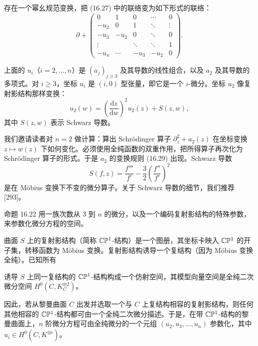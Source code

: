\begin{proposition}[16.22（{{[107, Thm. 1]}}）] 存在一个幂幺规范变换，把 (16.27) 中的联络变为如下形式的联络：
\begin{equation}
\partial+
\begin{pmatrix}
0&1&0&\cdots&0\\
-u_2&0&1&\ddots&\vdots\\
-u_3&-u_2&0&\ddots&0\\
\vdots&&\ddots&\ddots&1\\
-u_n&\cdots&-u_3&-u_2&0
\end{pmatrix}.
\tag{16.28}
\end{equation}
\end{proposition}

上面的 $u_i$（$i=2,\dots,n$）是 $(a_j)_{j\ge3}$ 及其导数的线性组合，以及 $a_2$ 及其导数的多项式。对 $i\ge3$，坐标 $u_i$ 是 $(i,0)$ 型张量，即它是一个 $i$-微分。坐标 $u_2$ 像复射影结构那样变换：
\begin{equation}
u_2(w)=\left(\frac{\mathrm{d}z}{\mathrm{d}w}\right)^2u_2(z)+S(z,w),
\tag{16.29}
\end{equation}
其中 $S(z,w)$ 表示 Schwarz 导数。


我们邀请读者对 $n=2$ 做计算：算出 Schrödinger 算子 $\partial_z^2+a_2(z)$ 在坐标变换 $z\mapsto w(z)$ 下如何变化。必须使用全纯函数的双重作用，把所得算子再次化为 Schrödinger 算子的形式。于是 $a_2$ 的变换规则 (16.29) 出现。Schwarz 导数
\[
S(f,z)=\frac{f'''}{f'}-\frac32\left(\frac{f''}{f'}\right)^2
\]
是在 Möbius 变换下不变的微分算子。关于 Schwarz 导数的细节，我们推荐 [293]。

命题 16.22 用一族次数从 3 到 $n$ 的微分，以及一个编码复射影结构的特殊参数，来参数化微分方程的空间。

曲面 $S$ 上的复射影结构（简称 $\mathbb{C}\mathbb{P}^1$-结构）是一个图册，其坐标卡映入 $\mathbb{C}\mathbb{P}^1$ 的开子集，转移函数为 Möbius 变换。复射影结构诱导一个复结构（因为 Möbius 变换全纯）。已知所有

诱导 $S$ 上同一复结构的 $\mathbb{C}\mathbb{P}^1$-结构构成一个仿射空间，其模型向量空间是全纯二次微分空间 $H^0(C,K_C^{\otimes2})$。

因此，若从黎曼曲面 $C$ 出发并选取一个与 $C$ 上复结构相容的复射影结构，则任何其他相容的 $\mathbb{C}\mathbb{P}^1$-结构都可由一个全纯二次微分描述。于是，在带 $\mathbb{C}\mathbb{P}^1$-结构的黎曼曲面上，$n$ 阶微分方程可由全纯微分的一个元组 $(u_2,u_3,\dots,u_n)$ 参数化，其中 $u_i\in H^0(C,K^{\otimes i})$。

